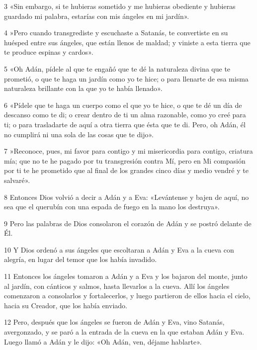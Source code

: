 \par 3 «Sin embargo, si te hubieras sometido y me hubieras obediente y hubieras guardado mi palabra, estarías con mis ángeles en mi jardín».

\par 4 »Pero cuando transgrediste y escuchaste a Satanás, te convertiste en su huésped entre sus ángeles, que están llenos de maldad; y viniste a esta tierra que te produce espinas y cardos».

\par 5 «Oh Adán, pídele al que te engañó que te dé la naturaleza divina que te prometió, o que te haga un jardín como yo te hice; o para llenarte de esa misma naturaleza brillante con la que yo te había llenado».

\par 6 «Pídele que te haga un cuerpo como el que yo te hice, o que te dé un día de descanso como te di; o crear dentro de ti un alma razonable, como yo creé para ti; o para trasladarte de aquí a otra tierra que ésta que te di. Pero, oh Adán, él no cumplirá ni una sola de las cosas que te dijo».

\par 7 »Reconoce, pues, mi favor para contigo y mi misericordia para contigo, criatura mía; que no te he pagado por tu transgresión contra Mí, pero en Mi compasión por ti te he prometido que al final de los grandes cinco días y medio vendré y te salvaré».

\par 8 Entonces Dios volvió a decir a Adán y a Eva: «Levántense y bajen de aquí, no sea que el querubín con una espada de fuego en la mano los destruya».

\par 9 Pero las palabras de Dios consolaron el corazón de Adán y se postró delante de Él.

\par 10 Y Dios ordenó a sus ángeles que escoltaran a Adán y Eva a la cueva con alegría, en lugar del temor que los había invadido.

\par 11 Entonces los ángeles tomaron a Adán y a Eva y los bajaron del monte, junto al jardín, con cánticos y salmos, hasta llevarlos a la cueva. Allí los ángeles comenzaron a consolarlos y fortalecerlos, y luego partieron de ellos hacia el cielo, hacia su Creador, que los había enviado.

\par 12 Pero, después que los ángeles se fueron de Adán y Eva, vino Satanás, avergonzado, y se paró a la entrada de la cueva en la que estaban Adán y Eva. Luego llamó a Adán y le dijo: «Oh Adán, ven, déjame hablarte».

